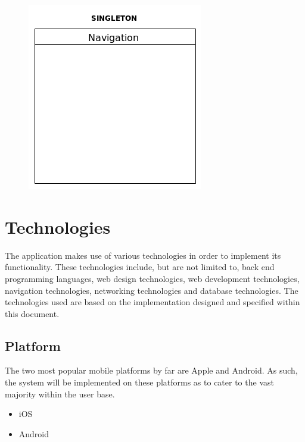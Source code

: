 \documentclass{article}
\begin{document}
	\begin{figure}[h]
  		\includegraphics[width=\textwidth]{Images/Singleton.png}
	\end{figure}

\section{Technologies}
The application makes use of various technologies in order to implement its functionality. These technologies include, but are not limited to, back end programming languages, web design technologies, web development technologies, navigation technologies, networking technologies and database technologies.  The technologies used are based on the implementation designed and specified within this document.  
	\subsection{Platform}
The two most popular mobile platforms by far are Apple and Android.  As such, the system will be implemented on these platforms as to cater to the vast majority within the user base. 
		\begin{itemize}
			\item iOS
			\item Android
		\end{itemize}
\end{document}
